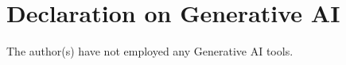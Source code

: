 \documentclass[
]{ceurart}
\begin{document}








\section*{Declaration on Generative AI}
  The author(s) have not employed any Generative AI tools.
%  
 


\end{document}
